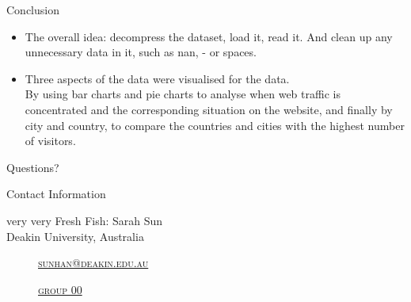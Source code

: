 \documentclass[
 size=14pt,
 paper=smartboard,  %
 mode=present, 		%
 display=slides, 	%
 style=tuliplab,  	%
 pauseslide,
 fleqn,leqno]{powerdot}
\begin{document}
\begin{slide}[toc=,bm=]{Conclusion}
\begin{itemize}
\item
\smallskip
The overall idea: decompress the dataset, load it, read it. And clean up any unnecessary data in it, such as nan, - or spaces.

\item
\smallskip
Three aspects of the data were visualised for the data.\\

By using bar charts and pie charts to analyse when web traffic is concentrated and the corresponding situation on the website, and finally by city and country, to compare the countries and cities with the highest number of visitors.

\end{itemize}



\end{slide}


%
\begin{slide}[toc=,bm=]{Questions?}
\begin{center}
\begin{figure}
\end{figure}
\end{center}
\end{slide}


\begin{wideslide}[toc=,bm=]{Contact Information}
\centering
{}
\twocolumn[
lcolwidth=0.35\linewidth,
rcolwidth=0.65\linewidth
]
{
}
{
very very Fresh Fish: Sarah Sun\\
Deakin University, Australia
\begin{description}
 \item[\textcolor{orange}{\faEnvelope}] \href{mailto:sunhan@deakin.edu.au}
 {\textsc{\footnotesize{sunhan@deakin.edu.au}}}

 \item[\textcolor{orange}{\faHome}] \href{http://www.tulip.org.au}
 {\textsc{\footnotesize{group 00}}}
\end{description}
}
\end{wideslide}
\end{document}
